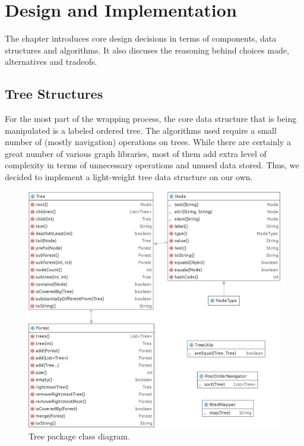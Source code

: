 \chapter{Design and Implementation}


The chapter introduces core design decisions in terms of components, data structures and algorithms. It also discuses the reasoning behind choices made, alternatives and tradeofs.


\section{Tree Structures}

For the most part of the wrapping process, the core data structure that is being manipulated is a labeled ordered tree. The algorithms used require a small number of (mostly navigation) operations on trees. While there are certainly a great number of various graph libraries, most of them add extra level of complexity in terms of unnecessary operations and unused data stored. Thus, we decided to implement a light-weight tree data structure on our own.

\begin{figure}[h]
	\centering
	\includegraphics[width=1.0\textwidth]{figures/package-tree}
	\caption{Tree package class diagram.}
	\label{fig:package-tree}
\end{figure}

